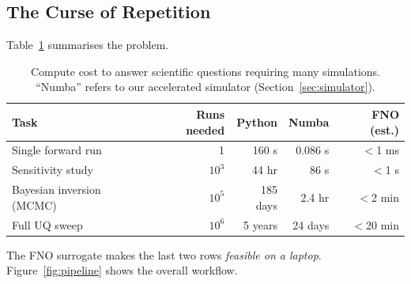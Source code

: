 \documentclass[12pt, a4paper]{article}
\theoremstyle{definition}
\begin{document}
\subsection{The Curse of Repetition}

Table~\ref{tab:cost} summarises the problem.

\begin{table}[H]
  \centering
  \caption{Compute cost to answer scientific questions requiring many simulations.
           ``Numba'' refers to our accelerated simulator (Section~\ref{sec:simulator}).}
  \label{tab:cost}
  \begin{tabular}{lrrrr}
    \toprule
    \textbf{Task} & \textbf{Runs needed} & \textbf{Python} & \textbf{Numba} & \textbf{FNO (est.)} \\
    \midrule
    Single forward run & 1 & 160 s & 0.086 s & $<$1 ms \\
    Sensitivity study & $10^3$ & 44 hr & 86 s & $<$1 s \\
    Bayesian inversion (MCMC) & $10^5$ & 185 days & 2.4 hr & $<$2 min \\
    Full UQ sweep & $10^6$ & 5 years & 24 days & $<$20 min \\
    \bottomrule
  \end{tabular}
\end{table}

\noindent The FNO surrogate makes the last two rows \textit{feasible on a
laptop}.  Figure~\ref{fig:pipeline} shows the overall workflow.
\end{document}
